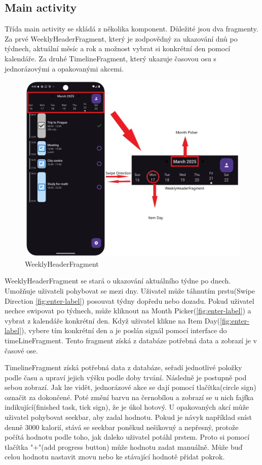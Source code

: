 \subsection{Main activity}
\hspace{14pt} Třída main activity se skládá z několika komponent. Důležité jsou dva fragmenty. Za prvé WeeklyHeaderFragment, který je zodpovědný za ukazování dnů po týdnech, aktuální měsíc a rok a možnost vybrat si konkrétní den pomocí kalendáře. Za druhé TimelineFragment, který ukazuje časovou osu s jednorázovými a opakovanými akcemi. 
\begin{figure}[H]
    \centering
    \includegraphics[width=0.9\linewidth]{images/WeeklyHeaderFragmentDetail.png}
    \caption{WeeklyHeaderFragment}
    \label{fig:enter-label}
\end{figure}

WeeklyHeaderFragment se stará o ukazování aktuálního týdne po dnech. Umožňuje uživateli pohybovat se mezi dny. Uživatel může táhnutím prstu(Swipe Direction \autoref{fig:enter-label}) posouvat týdny dopředu nebo dozadu. Pokud uživatel nechce swipovat po týdnech, může kliknout na Month Picker(\autoref{fig:enter-label}) a vybrat z kalendáře konkrétní den. Když uživatel klikne na Item Day(\autoref{fig:enter-label}), vybere tím konkrétní den a je poslán signál pomocí interface do timeLineFragment. Tento fragment získá z databáze potřebná data a zobrazí je v časové ose.

TimelineFragment získá potřebná data z databáze, seřadí jednotlivé položky podle času a upraví jejich výšku podle doby trvání. Následně je postupně pod sebou zobrazí. Jak lze vidět, jednorázové akce se dají pomocí tlačítka(circle sign) označit za dokončené. Poté změní barvu na černobílou a zobrazí se u nich fajfka indikující(finished task, tick sign), že je úkol hotový. U opakovaných akcí může uživatel pohybovat seekbar, aby zadal hodnotu. Pokud je návyk například sníst denně 3000 kalorií, stává se seekbar poněkud nešikovný a nepřesný, protože počítá hodnotu podle toho, jak daleko uživatel potáhl prstem. Proto si pomocí tlačítka "+"(add progress button) může hodnotu zadat manuálně. Může buď celou hodnotu nastavit znovu nebo ke stávající hodnotě přidat pokrok.

